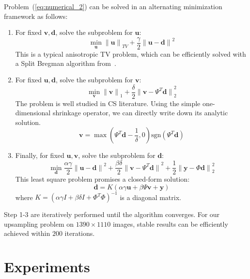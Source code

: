\documentclass[preprint,10pt,5p,times,twocolumn]{elsarticle}
\begin{document}
Problem~(\ref{eq:numerical_2}) can be solved in an alternating minimization framework as follows:
\begin{enumerate}
\item For fixed $\mathbf{v},\mathbf{d}$, solve the subproblem for $\mathbf{u}$:
\begin{equation}
\label{eq:numerical_3}
\min_{\mathbf{u}}{\|\mathbf{u}\|}_{TV}+\frac{\gamma}{2}{\|\mathbf{u}-\mathbf{d}\|}^2
\end{equation}
This is a typical anisotropic TV problem, which can be efficiently solved with a Split Bregman algorithm from~\cite{GO09}.
\item For fixed $\mathbf{u},\mathbf{d}$, solve the subproblem for $\mathbf{v}$:
\begin{equation}
\label{eq:numerical_4}
\min_{\mathbf{v}}{{\|\mathbf{v}\|}_{1}}+\frac{\delta}{2}{\|\mathbf{v}-\Psi^{T}\mathbf{d}\|}^2_{2}
\end{equation}
The problem is well studied in CS literature. Using the simple one-dimensional shrinkage operator, we can directly write down its analytic solution.
\begin{equation}
\label{eq:numerical_solution_4}
\mathbf{v} = \max{(\Psi^{T}\mathbf{d}-\frac{1}{\delta},0)}\text{sgn}(\Psi^{T}\mathbf{d})
\end{equation}
\item Finally, for fixed $\mathbf{u},\mathbf{v}$, solve the subproblem for $\mathbf{d}$:
\begin{equation}
\label{eq:numerical_5}
\min_{\mathbf{d}}\frac{\alpha\gamma}{2}{\|\mathbf{u}-\mathbf{d}\|}^2+\frac{\beta\delta}{2}{\|\mathbf{v}-\Psi^{T}\mathbf{d}\|}^2+\frac{1}{2}{\|\mathbf{y} - \Phi\mathbf{d}\|}_{2}^{2}
\end{equation}
This least square problem promises a closed-form solution:
\begin{equation}
\label{eq:numerical_solution_5}
\mathbf{d} = K(\alpha\gamma\mathbf{u}+\beta\Psi\mathbf{v}+\mathbf{y})
\end{equation}
where $K={(\alpha\gamma I + \beta\delta I + \Phi^{T}\Phi)}^{-1}$ is a diagonal matrix.
\end{enumerate}
Step 1-3 are iteratively performed until the algorithm converges. For our upsampling problem on $1390\times1110$ images, stable results can be efficiently achieved within $200$ iterations.


\section{Experiments}
\label{chap:experiments}
\end{document}

